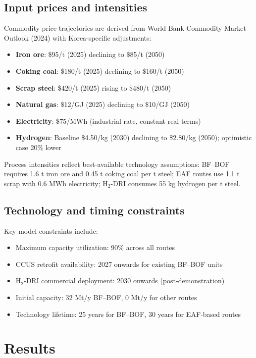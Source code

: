 \documentclass[preprint,5p,authoryear]{elsarticle}
\begin{document}
\subsection{Input prices and intensities}
Commodity price trajectories are derived from World Bank Commodity Market Outlook (2024) with Korea-specific adjustments:
\begin{itemize}[leftmargin=*]
  \item \textbf{Iron ore}: \$95/t (2025) declining to \$85/t (2050)
  \item \textbf{Coking coal}: \$180/t (2025) declining to \$160/t (2050)
  \item \textbf{Scrap steel}: \$420/t (2025) rising to \$480/t (2050)
  \item \textbf{Natural gas}: \$12/GJ (2025) declining to \$10/GJ (2050)
  \item \textbf{Electricity}: \$75/MWh (industrial rate, constant real terms)
  \item \textbf{Hydrogen}: Baseline \$4.50/kg (2030) declining to \$2.80/kg (2050); optimistic case 20\% lower
\end{itemize}

Process intensities reflect best-available technology assumptions: BF--BOF requires 1.6 t iron ore and 0.45 t coking coal per t steel; EAF routes use 1.1 t scrap with 0.6 MWh electricity; H$_2$-DRI consumes 55 kg hydrogen per t steel.

\subsection{Technology and timing constraints}
Key model constraints include:
\begin{itemize}[leftmargin=*]
  \item Maximum capacity utilization: 90\% across all routes
  \item CCUS retrofit availability: 2027 onwards for existing BF--BOF units
  \item H$_2$-DRI commercial deployment: 2030 onwards (post-demonstration)
  \item Initial capacity: 32 Mt/y BF--BOF, 0 Mt/y for other routes
  \item Technology lifetime: 25 years for BF--BOF, 30 years for EAF-based routes
\end{itemize}

\section{Results}
\end{document}
